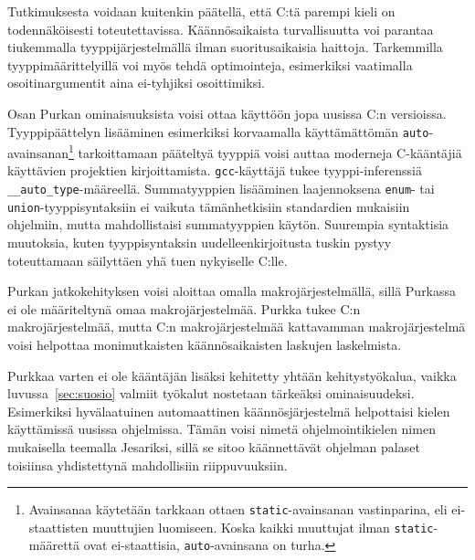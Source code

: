 Tutkimuksesta voidaan kuitenkin päätellä, että C:tä parempi kieli on
todennäköisesti toteutettavissa. Käännösaikaista turvallisuutta voi parantaa
tiukemmalla tyyppijärjestelmällä ilman suoritusaikaisia haittoja. Tarkemmilla
tyyppimäärittelyillä voi myös tehdä optimointeja, esimerkiksi vaatimalla
osoitinargumentit aina ei-tyhjiksi osoittimiksi.

Osan Purkan ominaisuuksista voisi ottaa käyttöön jopa uusissa C:n versioissa.
Tyyppipäättelyn lisääminen esimerkiksi korvaamalla käyttämättömän
\texttt{auto}-avainsanan\footnote{Avainsanaa käytetään tarkkaan ottaen
\texttt{static}-avainsanan vastinparina, eli ei-staattisten muuttujien
luomiseen. Koska kaikki muuttujat ilman \texttt{static}-määrettä ovat
ei-staattisia, \texttt{auto}-avainsana on turha.} tarkoittamaan pääteltyä
tyyppiä voisi auttaa moderneja C-kääntäjiä käyttävien projektien
kirjoittamista. \texttt{gcc}-käyttäjä tukee tyyppi-inferenssiä
\texttt{\_\_auto\_type}-määreellä. Summatyyppien lisääminen laajennoksena
\texttt{enum}- tai \texttt{union}-tyyppisyntaksiin ei vaikuta tämänhetkisiin
standardien mukaisiin ohjelmiin, mutta mahdollistaisi summatyyppien käytön.
Suurempia syntaktisia muutoksia, kuten tyyppisyntaksin uudelleenkirjoitusta
tuskin pystyy toteuttamaan säilyttäen yhä tuen nykyiselle C:lle.

Purkan jatkokehityksen voisi aloittaa omalla makrojärjestelmällä, sillä
Purkassa ei ole määriteltynä omaa makrojärjestelmää. Purkka tukee C:n
makrojärjestelmää, mutta C:n makrojärjestelmää kattavamman makrojärjestelmä
voisi helpottaa monimutkaisten käännösaikaisten laskujen laskelmista.

Purkkaa varten ei ole kääntäjän lisäksi kehitetty yhtään kehitystyökalua,
vaikka luvussa~\ref{sec:suosio} valmiit työkalut nostetaan tärkeäksi
ominaisuudeksi. Esimerkiksi hyvälaatuinen automaattinen käännösjärjestelmä
helpottaisi kielen käyttämissä uusissa ohjelmissa. Tämän voisi nimetä
ohjelmointikielen nimen mukaisella teemalla Jesariksi, sillä se sitoo
käännettävät ohjelman palaset toisiinsa yhdistettynä mahdollisiin
riippuvuuksiin.
